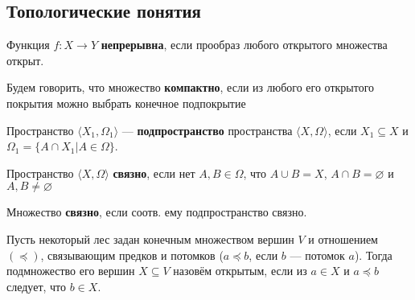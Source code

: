 \subsection{Топологические понятия}

Функция $f: X \rightarrow Y$ \textbf{непрерывна}, если прообраз любого открытого множества открыт.
    

 Будем говорить, что множество \textbf{компактно}, если из любого его открытого покрытия можно выбрать конечное
подпокрытие


 Пространство $\langle X_1, \Omega_1\rangle$ --- \textbf{подпространство} пространства $\langle X, \Omega\rangle$,
если $X_1 \subseteq X$ и $\Omega_1 = \{ A\cap X_1 | A \in \Omega\}$.


 Пространство $\langle X, \Omega\rangle$ \textbf{связно}, если нет $A,B \in \Omega$, что $A\cup B = X$,
$A \cap B = \varnothing$ и $A,B \ne \varnothing$

  Множество \textbf{связно}, если соотв. ему подпространство связно. 


 Пусть некоторый лес задан конечным множеством вершин $V$ и
отношением $(\preceq)$, связывающим предков и потомков ($a \preceq b$, если $b$ --- потомок $a$). Тогда подмножество его вершин $X\subseteq V$ назовём открытым, 
если из $a \in X$ и $a \preceq b$ следует, что $b \in X$.


